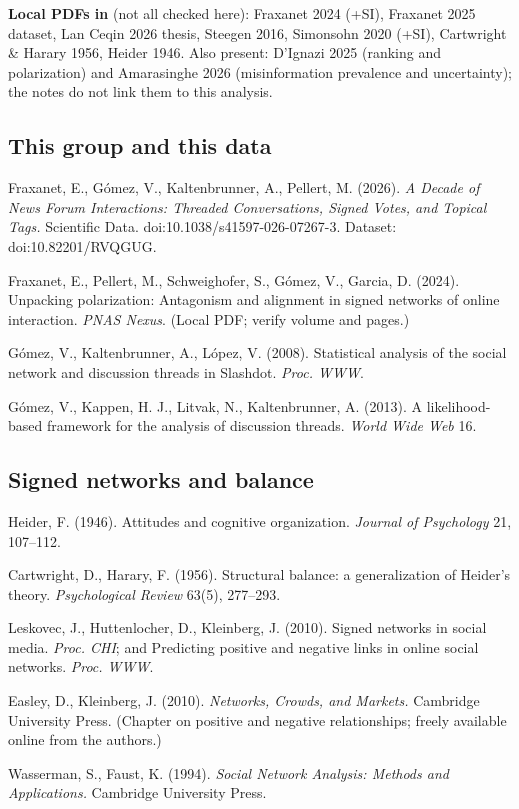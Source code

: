 \documentclass[11pt,a4paper]{article}
\newcommand{\file}[1]{\path{#1}}
\begin{document}
\textbf{Local PDFs in \file{notes/papers/}} (not all checked here): Fraxanet 2024 (+SI), Fraxanet 2025 dataset, Lan Ceqin 2026 thesis, Steegen 2016, Simonsohn 2020 (+SI), Cartwright \& Harary 1956, Heider 1946. Also present: D'Ignazi 2025 (ranking and polarization) and Amarasinghe 2026 (misinformation prevalence and uncertainty); the notes do not link them to this analysis.

\subsection*{This group and this data}
\begin{enumerate}[label={[\arabic*]},ref=\arabic*,series=refs]
  \item\label{ref:dataset} Fraxanet, E., G\'omez, V., Kaltenbrunner, A., Pellert, M. (2026). \emph{A Decade of News Forum Interactions: Threaded Conversations, Signed Votes, and Topical Tags.} Scientific Data. doi:10.1038/s41597-026-07267-3. Dataset: doi:10.82201/RVQGUG.
  \item\label{ref:faultana} Fraxanet, E., Pellert, M., Schweighofer, S., G\'omez, V., Garcia, D. (2024). Unpacking polarization: Antagonism and alignment in signed networks of online interaction. \emph{PNAS Nexus}. (Local PDF; verify volume and pages.)
  \item\label{ref:gomez08} G\'omez, V., Kaltenbrunner, A., L\'opez, V. (2008). Statistical analysis of the social network and discussion threads in Slashdot. \emph{Proc. WWW}.
  \item\label{ref:gomez13} G\'omez, V., Kappen, H. J., Litvak, N., Kaltenbrunner, A. (2013). A likelihood-based framework for the analysis of discussion threads. \emph{World Wide Web} 16.
\end{enumerate}

\subsection*{Signed networks and balance}
\begin{enumerate}[label={[\arabic*]},ref=\arabic*,resume=refs]
  \item\label{ref:heider} Heider, F. (1946). Attitudes and cognitive organization. \emph{Journal of Psychology} 21, 107--112.
  \item\label{ref:cartwright} Cartwright, D., Harary, F. (1956). Structural balance: a generalization of Heider's theory. \emph{Psychological Review} 63(5), 277--293.
  \item\label{ref:leskovec} Leskovec, J., Huttenlocher, D., Kleinberg, J. (2010). Signed networks in social media. \emph{Proc. CHI}; and Predicting positive and negative links in online social networks. \emph{Proc. WWW}.
  \item\label{ref:easley} Easley, D., Kleinberg, J. (2010). \emph{Networks, Crowds, and Markets.} Cambridge University Press. (Chapter on positive and negative relationships; freely available online from the authors.)
  \item\label{ref:wasserman_net} Wasserman, S., Faust, K. (1994). \emph{Social Network Analysis: Methods and Applications.} Cambridge University Press.
\end{enumerate}
\end{document}
